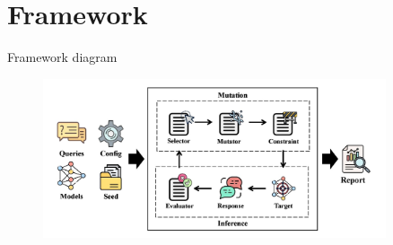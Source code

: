 \documentclass{beamer}
\begin{document}
\section{Framework}
\begin{frame}{Framework diagram}

    \begin{figure}[h]
    \centering
    \includegraphics[scale=0.3,width=0.9\textwidth]{pic/FrameworkDg3.jpg}
    \label{fig:enter-label21}
    \end{figure}

\end{frame}

\end{document}
